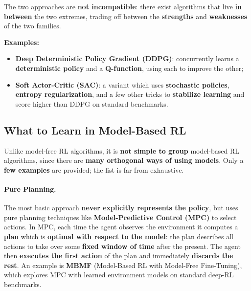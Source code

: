 \documentclass[11pt,a4paper]{article}
\theoremstyle{definition}
\theoremstyle{plain}
\theoremstyle{remark}
\begin{document}
The two approaches are \textbf{not incompatible}: there exist algorithms that live \textbf{in between} the two extremes, trading off between the \textbf{strengths} and \textbf{weaknesses} of the two families.

\textbf{Examples:}
\begin{itemize}
    \item \textbf{Deep Deterministic Policy Gradient (DDPG)}: concurrently learns a \textbf{deterministic policy} and a \textbf{Q-function}, using each to improve the other;
    \item \textbf{Soft Actor-Critic (SAC)}: a variant which uses \textbf{stochastic policies}, \textbf{entropy regularization}, and a few other tricks to \textbf{stabilize learning} and score higher than DDPG on standard benchmarks.
\end{itemize}

\subsection{What to Learn in Model-Based RL}

Unlike model-free RL algorithms, it is \textbf{not simple to group} model-based RL algorithms, since there are \textbf{many orthogonal ways of using models}. Only a \textbf{few examples} are provided; the list is far from exhaustive.

\paragraph{Pure Planning.} The most basic approach \textbf{never explicitly represents the policy}, but uses pure planning techniques like \textbf{Model-Predictive Control (MPC)} to select actions. In MPC, each time the agent observes the environment it computes a \textbf{plan} which is \textbf{optimal with respect to the model}: the plan describes all actions to take over some \textbf{fixed window of time} after the present. The agent then \textbf{executes the first action} of the plan and immediately \textbf{discards the rest}. An example is \textbf{MBMF} (Model-Based RL with Model-Free Fine-Tuning), which explores MPC with learned environment models on standard deep-RL benchmarks.
\end{document}
